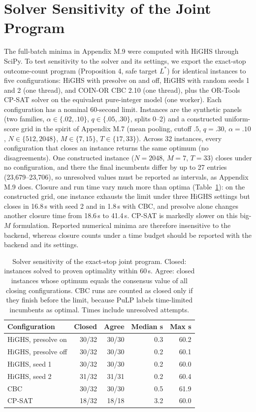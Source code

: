 \documentclass[11pt]{article}
\begin{document}
\section{Solver Sensitivity of the Joint Program}
\label{app:solvers}
The full-batch minima in Appendix M.9 were computed with HiGHS through SciPy. To test sensitivity to the solver and its settings, we export the exact-stop outcome-count program (Proposition 4, safe target $L^*$) for identical instances to five configurations: HiGHS with presolve on and off, HiGHS with random seeds 1 and 2 (one thread), and COIN-OR CBC 2.10 (one thread), plus the OR-Tools CP-SAT solver on the equivalent pure-integer model (one worker). Each configuration has a nominal 60-second limit. Instances are the synthetic panels (two families, $\alpha\in\{.02,.10\}$, $q\in\{.05,.30\}$, splits 0--2) and a constructed uniform-score grid in the spirit of Appendix M.7 (mean pooling, cutoff $.5$, $q=.30$, $\alpha=.10$, $N\in\{512,2048\}$, $M\in\{7,15\}$, $T\in\{17,33\}$). Across 32 instances, every configuration that closes an instance returns the same optimum (no disagreements). One constructed instance ($N=2048$, $M=7$, $T=33$) closes under no configuration, and there the final incumbents differ by up to 27 entries (23,679--23,706), so unresolved values must be reported as intervals, as Appendix M.9 does. Closure and run time vary much more than optima (Table~\ref{tab:solvers}): on the constructed grid, one instance exhausts the limit under three HiGHS settings but closes in 16.8\,s with seed 2 and in 1.8\,s with CBC, and presolve alone changes another closure time from 18.6\,s to 41.4\,s. CP-SAT is markedly slower on this big-$M$ formulation. Reported numerical minima are therefore insensitive to the backend, whereas closure counts under a time budget should be reported with the backend and its settings.

\begin{table}[t]
\centering\small
\setlength{\tabcolsep}{3pt}
\begin{tabular}{@{}lrrrr@{}}
\toprule
Configuration & Closed & Agree & Median s & Max s\\
\midrule
HiGHS, presolve on & 30/32 & 30/30 & 0.3 & 60.2\\
HiGHS, presolve off & 30/32 & 30/30 & 0.2 & 60.1\\
HiGHS, seed 1 & 30/32 & 30/30 & 0.2 & 60.0\\
HiGHS, seed 2 & 31/32 & 31/31 & 0.2 & 60.4\\
CBC & 30/32 & 30/30 & 0.5 & 61.9\\
CP-SAT & 18/32 & 18/18 & 3.2 & 60.0\\
\bottomrule
\end{tabular}
\caption{Solver sensitivity of the exact-stop joint program. Closed: instances solved to proven optimality within 60\,s. Agree: closed instances whose optimum equals the consensus value of all closing configurations. CBC runs are counted as closed only if they finish before the limit, because PuLP labels time-limited incumbents as optimal. Times include unresolved attempts.}
\label{tab:solvers}
\end{table}
\end{document}
